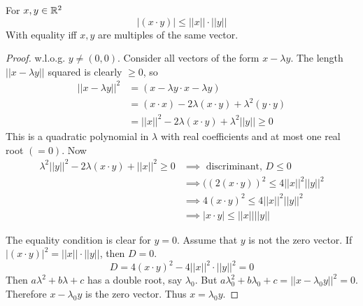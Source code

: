 \documentclass[10pt]{scrartcl}
\begin{document}
\begin{proposition}
For $x,y \in\mathbb{R}^2$ {\normalfont {}}
\[|(x\cdot y)| \leq ||x|| \cdot ||y||\]
With equality iff $x,y$ are multiples of the same vector. 
\end{proposition}
\begin{proof}
w.l.o.g. $y \neq (0,0)$. Consider all vectors of the form $x -\lambda y$. The length $||x-\lambda y||$ squared is clearly $\geq 0$, so 
\begin{align*}
  ||x-\lambda y||^2 &= (x-\lambda y \cdot x -\lambda y)\\
  &= (x\cdot x) - 2\lambda(x\cdot y) + \lambda^2(y\cdot y)\\
  &= ||x||^2 - 2\lambda(x\cdot y) + \lambda^2||y|| \geq 0
\end{align*}
This is a quadratic polynomial in $\lambda$ with real coefficients and at most one real root $(=0)$. Now 
\begin{align*}
  \lambda^2 ||y||^2 - 2\lambda(x\cdot y) + ||x||^2 \geq 0 &\implies \text{ discriminant, }D \leq 0\\
  &\implies ((2(x\cdot y))^2 \leq 4||x||^2||y||^2\\
  &\implies 4(x\cdot y)^2 \leq 4||x||^2||y||^2\\
  &\implies |x\cdot y| \leq ||x||||y||
\end{align*}

	
The equality condition is clear for $y=0$. Assume that $y$ is not the zero vector. If $|(x\cdot y)|^2 = ||x|| \cdot ||y||$, then $D = 0$. \[D = 4(x\cdot y)^2 -4||x||^2 \cdot ||y||^2 =0\] Then $a\lambda^2 + b\lambda +c$ has a double root, say $\lambda_0$. But $a\lambda_0^2 + b\lambda_0 + c= ||x-\lambda_0y||^2 = 0$. Therefore $x-\lambda_0y$ is the zero vector. Thus $x = \lambda_0y$. 			
\end{proof}\vspace*{5pt}
\end{document}
